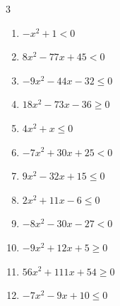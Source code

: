 \begin{multicols}{3}
\begin{enumerate}
  \item $-x^{2}+1<0$

        \phantom{$\displaystyle x < -1 , \; 1 < x$}

  \item $8x^{2}-77x+45<0$


  \item $-9x^{2}-44x-32\leq 0$


  \item $18x^{2}-73x-36\geq 0$


  \item $4x^{2}+x\leq 0$


  \item $-7x^{2}+30x+25<0$


\columnbreak %

  \item $9x^{2}-32x+15\leq 0$


  \item $2x^{2}+11x-6\leq 0$


  \item $-8x^{2}-30x-27<0$


  \item $-9x^{2}+12x+5\geq 0$


  \item $56x^{2}+111x+54\geq 0$


  \item $-7x^{2}-9x+10\leq 0$



\end{enumerate}
\end{multicols}
